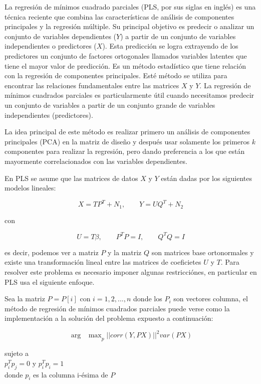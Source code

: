 La regresión de mínimos cuadrado parciales (PLS, por sus siglas en inglés) es una técnica reciente que combina las características de análisis de componentes principales y la regresión múltiple. Su principal objetivo es predecir o analizar un conjunto de variables dependientes ($Y$) a partir de un conjunto de variables independientes o predictores ($X$). Esta predicción se logra extrayendo de los predictores un conjunto de factores ortogonales llamados variables latentes que tiene el mayor valor de predicción. Es un método estadístico que tiene relación con la regresión de componentes principales. Esté método se utiliza para encontrar las relaciones fundamentales entre las matrices $X$ y $Y$. La regresión de mínimos cuadrados parciales es particularmente útil cuando necesitamos predecir un conjunto de variables a partir de un conjunto grande de variables independientes (predictores).  

La idea principal de este método es realizar primero un análisis de componentes principales (PCA) en la matriz de diseño y después usar solamente los primeros $k$ componentes para realizar la regresión, pero dando preferencia a los que están mayormente correlacionados con las variables dependientes. 

En PLS se asume que las matrices de datos $X$ y $Y$ están dadas por los siguientes modelos lineales: 

\begin{equation}\label{modeloPLS}
X = TP^{T} + N_{1}, \qquad
Y = UQ^{T} + N_{2} 
\end{equation}

con

\begin{equation}\label{modeloPLS2}
U = T\beta, \qquad P^{T}P = I, \qquad Q^{T}Q = I
\end{equation}

es decir, podemos ver a matriz $P$ y la matriz $Q$ son matrices base ortonormales y existe una transformación lineal entre las matrices de coeficietes $U$ y $T$. Para resolver este problema es necesario imponer algunas restricciónes, en particular en PLS usa el siguiente enfoque.


Sea la matriz $P = P[i]$ con $i = 1,2, ..., n$ donde los $P_{i}$ son vectores columna, el método de regresión de mínimos cuadrados parciales puede verse como la implementación a la solución del problema expuesto a continuación:  

\begin{equation}\label{PLSP}
\mathop{arg \quad max}_{p} ||corr(Y, PX)||^{2} var(PX)
\end{equation}
\begin{center}
sujeto a \\
$p_{i}^{T}p_{j} = 0$  y $p_{i}^{T}p_{i} = 1$ \\
donde $p_{i}$ es la columna i-ésima de $P$
\end{center}

